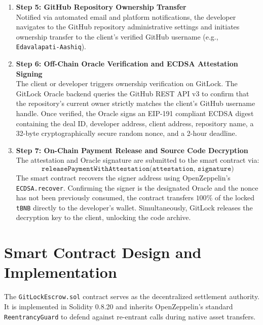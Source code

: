 \documentclass[11pt,a4paper]{article}
\begin{document}
\begin{enumerate}
    \item \textbf{Step 5: GitHub Repository Ownership Transfer} \\
    Notified via automated email and platform notifications, the developer navigates to the GitHub repository administrative settings and initiates ownership transfer to the client's verified GitHub username (e.g., \texttt{Edavalapati-Aashiq}).

    \item \textbf{Step 6: Off-Chain Oracle Verification and ECDSA Attestation Signing} \\
    The client or developer triggers ownership verification on GitLock. The GitLock Oracle backend queries the GitHub REST API v3 to confirm that the repository's current owner strictly matches the client's GitHub username handle. Once verified, the Oracle signs an EIP-191 compliant ECDSA digest containing the deal ID, developer address, client address, repository name, a 32-byte cryptographically secure random nonce, and a 2-hour deadline.

    \item \textbf{Step 7: On-Chain Payment Release and Source Code Decryption} \\
    The attestation and Oracle signature are submitted to the smart contract via:
    \begin{equation}
        \texttt{releasePaymentWithAttestation(attestation, signature)}
    \end{equation}
    The smart contract recovers the signer address using OpenZeppelin's \texttt{ECDSA.recover}. Confirming the signer is the designated Oracle and the nonce has not been previously consumed, the contract transfers $100\%$ of the locked \texttt{tBNB} directly to the developer's wallet. Simultaneously, GitLock releases the decryption key to the client, unlocking the code archive.
\end{enumerate}

\section{Smart Contract Design and Implementation}
The \texttt{GitLockEscrow.sol} contract serves as the decentralized settlement authority. It is implemented in Solidity 0.8.20 and inherits OpenZeppelin's standard \texttt{ReentrancyGuard} to defend against re-entrant calls during native asset transfers.
\end{document}
